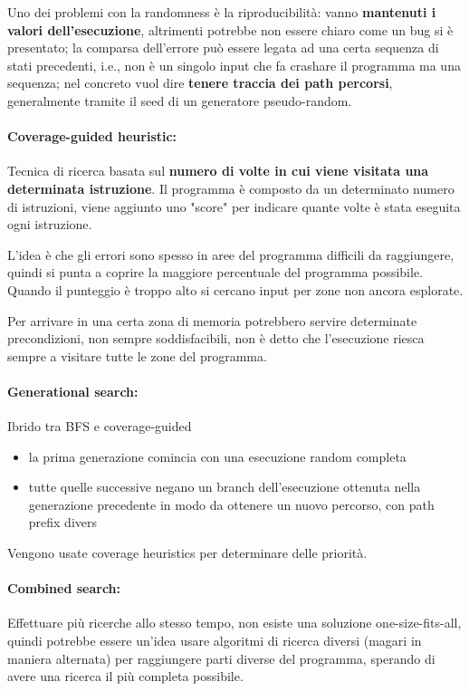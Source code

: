 Uno dei problemi con la randomness è la riproducibilità: vanno \textbf{mantenuti i valori dell'esecuzione}, altrimenti potrebbe non essere chiaro come un bug si è presentato; la comparsa dell'errore può essere legata ad una certa sequenza di stati precedenti, i.e., non è un singolo input che fa crashare il programma ma una sequenza; nel concreto vuol dire \textbf{tenere traccia dei path percorsi}, generalmente tramite il seed di  un generatore pseudo-random.

\paragraph{Coverage-guided heuristic:} Tecnica di ricerca basata sul \textbf{numero di volte in cui viene visitata una determinata istruzione}. Il programma è composto da un determinato numero di istruzioni, viene aggiunto uno "score" per indicare quante volte è stata eseguita ogni istruzione. 

L'idea è che gli errori sono spesso in aree del programma difficili da raggiungere, quindi si punta a coprire la maggiore percentuale del programma possibile. Quando il punteggio è troppo alto si cercano input per zone non ancora esplorate.

Per arrivare in una certa zona di memoria potrebbero servire determinate precondizioni, non sempre soddisfacibili, non è detto che l'esecuzione riesca sempre a visitare tutte le zone del programma.

\paragraph{Generational search:} Ibrido tra BFS e coverage-guided
\begin{itemize}
	\item la prima generazione comincia con una esecuzione random completa
	
    \item tutte quelle successive negano un branch dell'esecuzione ottenuta nella generazione precedente in modo da ottenere un nuovo percorso, con path prefix divers
\end{itemize}

Vengono usate coverage heuristics per determinare delle priorità.

\paragraph{Combined search:} Effettuare più ricerche allo stesso tempo, non esiste una soluzione one-size-fits-all, quindi potrebbe essere un'idea usare algoritmi di ricerca diversi (magari in maniera alternata) per raggiungere parti diverse del programma, sperando di avere una ricerca il più completa possibile.

